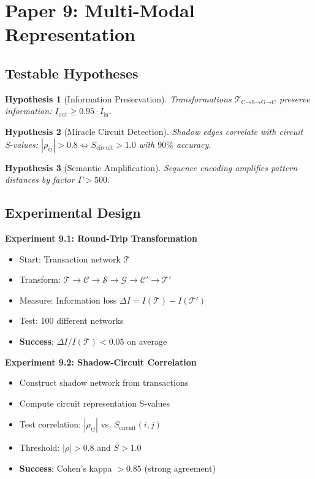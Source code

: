 \documentclass[12pt]{article}
\newtheorem{hypothesis}{Hypothesis}
\begin{document}
\section{Paper 9: Multi-Modal Representation}

\subsection{Testable Hypotheses}

\begin{hypothesis}[Information Preservation]
Transformations $\mathcal{T}_{\text{C→S→G→C}}$ preserve information: $I_{\text{out}} \geq 0.95 \cdot I_{\text{in}}$.
\end{hypothesis}

\begin{hypothesis}[Miracle Circuit Detection]
Shadow edges correlate with circuit S-values: $|\rho_{ij}| > 0.8 \iff S_{\text{circuit}} > 1.0$ with $90\%$ accuracy.
\end{hypothesis}

\begin{hypothesis}[Semantic Amplification]
Sequence encoding amplifies pattern distances by factor $\Gamma > 500$.
\end{hypothesis}

\subsection{Experimental Design}

\textbf{Experiment 9.1: Round-Trip Transformation}
\begin{itemize}
    \item Start: Transaction network $\mathcal{T}$
    \item Transform: $\mathcal{T} \to \mathcal{C} \to \mathcal{S} \to \mathcal{G} \to \mathcal{C}' \to \mathcal{T}'$
    \item Measure: Information loss $\Delta I = I(\mathcal{T}) - I(\mathcal{T}')$
    \item Test: 100 different networks
    \item \textbf{Success}: $\Delta I / I(\mathcal{T}) < 0.05$ on average
\end{itemize}

\textbf{Experiment 9.2: Shadow-Circuit Correlation}
\begin{itemize}
    \item Construct shadow network from transactions
    \item Compute circuit representation S-values
    \item Test correlation: $|\rho_{ij}|$ vs. $S_{\text{circuit}}(i,j)$
    \item Threshold: $|\rho| > 0.8$ and $S > 1.0$
    \item \textbf{Success}: Cohen's kappa $> 0.85$ (strong agreement)
\end{itemize}
\end{document}
